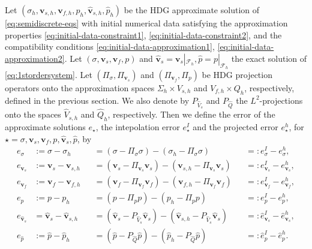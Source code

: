 \documentclass[10pt,letterpaper]{amsart}
\theoremstyle{plain} %
\theoremstyle{remark} %
\newcommand{\vect}[1]{\mathbf{#1}}
\newcommand{\Faces}{\mathcal{F}_h} %
\begin{document}
Let $(\sigma_{h}, \vect{v}_{s,h}, \vect{v}_{f,h}, p_{h}, \widehat{\vect{v}}_{s,h}, \widehat{p}_{h})$ be the HDG approximate solution of \eqref{eq:semidiscrete-eqs} with initial numerical data satisfying the approximation properties \eqref{eq:initial-data-constraint1}, \eqref{eq:initial-data-constraint2}, and the compatibility conditions \eqref{eq:initial-data-approximation1}, \eqref{eq:initial-data-approximation2}. Let $(\sigma, \vect{v}_s, \vect{v}_f, p)$ and $\widehat{\vect{v}}_s = \vect{v}_s|_{\Faces}, \widehat{p} = p|_{\Faces}$ the exact solution of \eqref{eq:1stordersystem}. Let $(\Pi_{\sigma}, \Pi_{\vect{v}_{s}})$ and $(\Pi_{\vect{v}_{f}}, \Pi_{p})$ be HDG projection operators onto the approximation spaces $\Sigma_h\times V_{s,h}$ and $V_{f,h}\times Q_h$, respectively,  defined in the previous section. We also denote by $P_{\widehat{V}_{s}}$ and $P_{\widehat{Q}}$ the $L^2$-projections onto the spaces $\widehat{V}_{s,h}$ and $\widehat{Q}_h$, respectively. Then we define the error of the approximate solutions $e_{\star}$, the intepolation error $e^I_{\star}$ and the projected error $e^{h}_{\star}$, for $\star = \sigma, \vect{v}_s, \vect{v}_f, p, \widehat{\vect{v}}_s, \widehat{p}$, by 
%
\begin{subequations}
	\label{eq:semidiscrete-error-decomposition-eqs}
	\begin{alignat}{4}
		\label{eq:semidiscrete-error-decomposition-eq1}
		e_{\sigma} &:= \sigma - \sigma_h & &= (\sigma - \Pi_{\sigma} \sigma) - (\sigma_h - \Pi_{\sigma} \sigma) & &=: e_{\sigma}^I - e_{\sigma}^h , 
		\\
		\label{eq:semidiscrete-error-decomposition-eq2}
		e_{\vect{v}_s} &:= \vect{v}_{s} - \vect{v}_{s,h} & &= (\vect{v}_{s} - \Pi_{\vect{v}_{s}} \vect{v}_{s}) - (\vect{v}_{s,h} - \Pi_{\vect{v}_{s}} \vect{v}_{s}) & &=: e_{\vect{v}_{s}}^I - e_{\vect{v}_{s}}^h , 
		\\
		\label{eq:semidiscrete-error-decomposition-eq3}
		e_{\vect{v}_f} &:= \vect{v}_{f} - \vect{v}_{f,h} & &= (\vect{v}_{f} - \Pi_{\vect{v}_{f}} \vect{v}_{f}) - (\vect{v}_{f,h} - \Pi_{\vect{v}_{f}} \vect{v}_{f}) & &=: e_{\vect{v}_{f}}^I - e_{\vect{v}_{f}}^h , 
		\\
		\label{eq:semidiscrete-error-decomposition-eq4}
		e_{p} &:= p - p_{h} & &= (p - \Pi_{p} p) - (p_{h} - \Pi_{p} p) & &=: e_{p}^I - e_{p}^h , 
		\\
		\label{eq:semidiscrete-error-decomposition-eq5}
		e_{\widehat{\vect{v}}_{s}} &= \widehat{\vect{v}}_{s} - \widehat{\vect{v}}_{s,h} & &= (\widehat{\vect{v}}_{s} - P_{\widehat{V}_{s}} \widehat{\vect{v}}_{s}) - (\widehat{\vect{v}}_{s,h} - P_{\widehat{V}_{s}} \widehat{\vect{v}}_{s}) & &=: \widehat{e}_{\vect{v}_{s}}^I - \widehat{e}_{\vect{v}_{s}}^h , 
		\\
		\label{eq:semidiscrete-error-decomposition-eq6}
		e_{\widehat{p}} &:= \widehat{p} - \widehat{p}_{h} & &= (\widehat{p} - {P_{\widehat{Q}}} \widehat{p}) - (\widehat{p}_{h} - {P_{\widehat{Q}}} \widehat{p}) & &=: \widehat{e}_{p}^I - \widehat{e}_{p}^h .
	\end{alignat}
\end{subequations}
%
\end{document}
